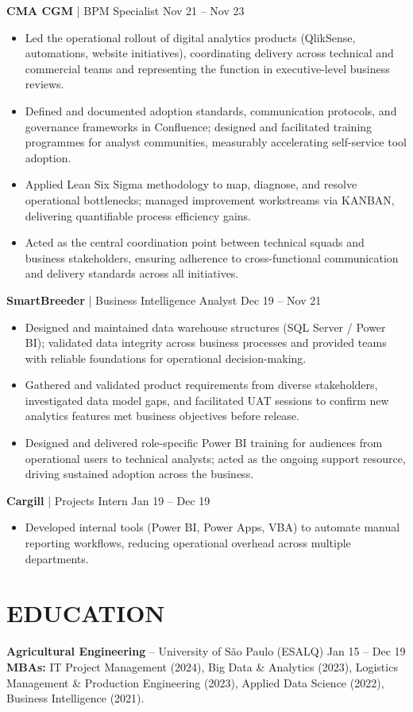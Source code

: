 \documentclass[9pt, letterpaper]{article}
\begin{document}
	\noindent \textbf{CMA CGM} | BPM Specialist \hfill Nov 21 -- Nov 23
	\begin{itemize}[noitemsep, topsep=1pt, leftmargin=1.5em, rightmargin=0.5cm]
		\item Led the operational rollout of digital analytics products (QlikSense, automations, website initiatives), coordinating delivery across technical and commercial teams and representing the function in executive-level business reviews.
		\item Defined and documented adoption standards, communication protocols, and governance frameworks in Confluence; designed and facilitated training programmes for analyst communities, measurably accelerating self-service tool adoption.
		\item Applied Lean Six Sigma methodology to map, diagnose, and resolve operational bottlenecks; managed improvement workstreams via KANBAN, delivering quantifiable process efficiency gains.
		\item Acted as the central coordination point between technical squads and business stakeholders, ensuring adherence to cross-functional communication and delivery standards across all initiatives.
	\end{itemize}

	\noindent \textbf{SmartBreeder} | Business Intelligence Analyst \hfill Dec 19 -- Nov 21
	\begin{itemize}[noitemsep, topsep=1pt, leftmargin=1.5em, rightmargin=0.5cm]
		\item Designed and maintained data warehouse structures (SQL Server / Power BI); validated data integrity across business processes and provided teams with reliable foundations for operational decision-making.
		\item Gathered and validated product requirements from diverse stakeholders, investigated data model gaps, and facilitated UAT sessions to confirm new analytics features met business objectives before release.
		\item Designed and delivered role-specific Power BI training for audiences from operational users to technical analysts; acted as the ongoing support resource, driving sustained adoption across the business.
	\end{itemize}

	\noindent \textbf{Cargill} | Projects Intern \hfill Jan 19 -- Dec 19
	\begin{itemize}[noitemsep, topsep=1pt, leftmargin=1.5em, rightmargin=0.5cm]
		\item Developed internal tools (Power BI, Power Apps, VBA) to automate manual reporting workflows, reducing operational overhead across multiple departments.
	\end{itemize}

	\section*{EDUCATION}
	\noindent \textbf{Agricultural Engineering} -- University of S\~{a}o Paulo (ESALQ) \hfill Jan 15 -- Dec 19 \\
	\noindent \textbf{MBAs:} IT Project Management (2024), Big Data \& Analytics (2023), Logistics Management \& Production Engineering (2023), Applied Data Science (2022), Business Intelligence (2021).
\end{document}
